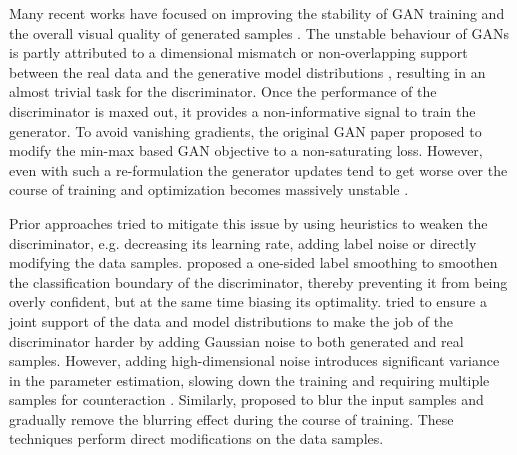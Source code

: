 \documentclass{article}
\begin{document}
Many recent works have focused on improving the stability of GAN training and the overall visual quality of generated samples \cite{Roth_NIPS2017,miyato2018spectral,Zhang_SAGAN18, Brock2019}.
The unstable behaviour of GANs is partly attributed to a dimensional mismatch or non-overlapping support between the real data and the generative model distributions \cite{Arjovsky2017TowardsPM}, 
resulting in an almost trivial task for the discriminator. Once the performance of the discriminator is maxed out, it provides a non-informative signal to train the generator. To avoid vanishing gradients, the original GAN paper \cite{goodfellow2014generative} proposed to modify the min-max based GAN objective to a non-saturating loss.
However, even with such a re-formulation the generator updates tend to get worse over the course of training and optimization becomes massively unstable \cite{Arjovsky2017TowardsPM}.

Prior approaches tried to mitigate this issue by using heuristics to weaken the discriminator, e.g. decreasing its learning rate, adding label noise or directly modifying the data samples.
\cite{SalimansNIPS2016} proposed a one-sided label smoothing to smoothen the classification boundary of the discriminator, thereby preventing it from being overly confident, but at the same time biasing its optimality. \cite{Arjovsky2017TowardsPM,Sonderby2016AmortisedMI} tried to ensure a joint support of the data and model distributions to make the job of the discriminator harder by adding Gaussian noise to both generated and real samples. However, adding high-dimensional noise introduces significant variance in the parameter estimation, slowing down the training and requiring multiple samples for counteraction \cite{Roth_NIPS2017}. Similarly, \cite{SajParMehSch18} proposed to blur the input samples and gradually remove the blurring effect during the course of training. These techniques perform direct modifications on the data samples.
\end{document}
